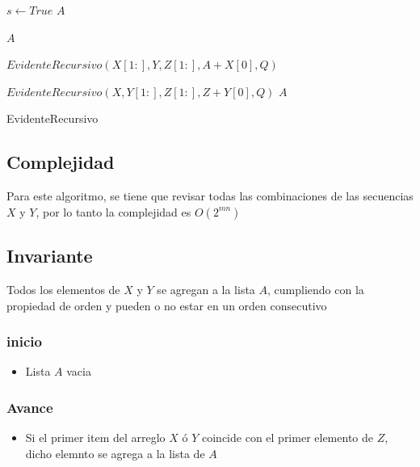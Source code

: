 \documentclass[]{article}
\numberwithin{equation}{section}
\numberwithin{figure}{section}
\theoremstyle{definition}
\begin{document}
	\begin{algorithm}[H]
	\begin{algorithmic}[1]


  			\State $s \leftarrow True$
  			\State\Return $A$
  		\EndIf
  		
  		
  				\State\Return $A$
  			\EndIf
  			
  						\State $EvidenteRecursivo(X[1:],Y,Z[1:],A+X[0],Q) $
  					\EndIf
  					
  				\EndIf
  						\State $EvidenteRecursivo(X,Y[1:],Z[1:],Z+Y[0],Q)$
  					\EndIf
  				\EndIf
  			\EndIf
  		\EndIf
  		\State\Return $A$

	\EndProcedure

	\end{algorithmic}
	\caption{\foreignlanguage{english}{EvidenteRecursivo}}
	\end{algorithm}
	
	
	\subsection*{Complejidad}
	
	\text Para este algoritmo, se tiene que revisar todas las combinaciones de las secuencias $X$ y $Y$, por lo tanto la complejidad es $O(2^{mn})$
	
	\subsection*{Invariante}
	
	\text Todos los elementos de $X$ y $Y$ se agregan a la lista $A$, cumpliendo con la propiedad de orden y pueden o no estar en un orden consecutivo
	
	\subsubsection*{inicio}
	\begin{itemize}
	\item Lista $A$ vacia
	\end{itemize}
	\subsubsection*{Avance}
	\begin{itemize}
	\item Si el primer item del arreglo $X$ ó $Y$ coincide con el primer elemento de $Z$, dicho elemnto se agrega a la lista de $A$
	\end{itemize}
\end{document}
